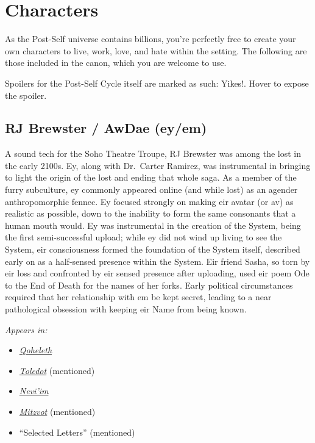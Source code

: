 \section*{Characters}

As the Post-Self universe contains billions, you're perfectly free to create your own characters to live, work, love, and hate within the setting. The following are those included in the canon, which you are welcome to use.

Spoilers for the Post-Self Cycle itself are marked as such: {Yikes!}. Hover to expose the spoiler.

\subsection{RJ Brewster / AwDae (ey/em)}

A sound tech for the Soho Theatre Troupe, RJ Brewster was among the lost in the early 2100s. Ey, along with Dr.~Carter Ramirez, was instrumental in bringing to light the origin of the lost and ending that whole saga. As a member of the furry subculture, ey commonly appeared online (and while lost) as an agender anthropomorphic fennec. Ey focused strongly on making eir avatar (or av) as realistic as possible, down to the inability to form the same consonants that a human mouth would. Ey was instrumental in the creation of the System, {being the first semi-successful upload; while ey did not wind up living to see the System, eir consciousness formed the foundation of the System itself, described early on as a half-sensed presence within the System. Eir friend Sasha, so torn by eir loss and confronted by eir sensed presence after uploading, used eir poem Ode to the End of Death for the names of her forks. Early political circumstances required that her relationship with em be kept secret, leading to a near pathological obsession with keeping eir Name from being known.}


\emph{Appears in:}

\begin{itemize}
\tightlist
\item
  \href{https://qoheleth.post-self.ink}{\emph{Qoheleth}}
\item
  \href{https://toledot.post-self.ink}{\emph{Toledot}} (mentioned)
\item
  \href{https://neviim.post-self.ink}{\emph{Nevi'im}}
\item
  \href{https://mitzvot.post-self.ink}{\emph{Mitzvot}} (mentioned)
\item
  ``Selected Letters'' (mentioned)
\end{itemize}

